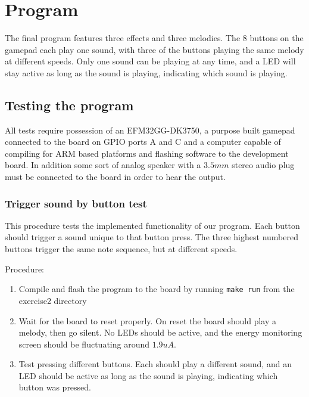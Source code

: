 \section{Program}
The final program features three effects and three melodies. The 8 buttons on the gamepad each play one sound, with three of the buttons playing the same melody at different speeds. Only one sound can be playing at any time, and a LED will stay active as long as the sound is playing, indicating which sound is playing.

\subsection{Testing the program}
All tests require possession of an EFM32GG-DK3750, a purpose built gamepad connected to the board on GPIO ports A and C and a computer capable of compiling for ARM based platforms and flashing software to the development board. In addition some sort of analog speaker with a $3.5mm$ stereo audio plug must be connected to the board in order to hear the output.

\subsubsection{Trigger sound by button test}
This procedure tests the implemented functionality of our program. Each button should trigger a sound unique to that button press. The three highest numbered buttons trigger the same note sequence, but at different speeds.

Procedure:
\begin{enumerate}
    \item   Compile and flash the program to the board by running \texttt{make run} from the exercise2 directory
    \item   Wait for the board to reset properly. On reset the board should play a melody, then go silent. No LEDs should be active, and the energy monitoring screen should be fluctuating around $1.9uA$.
    \item   Test pressing different buttons. Each should play a different sound, and an LED should be active as long as the sound is playing, indicating which button was pressed.
\end{enumerate}

